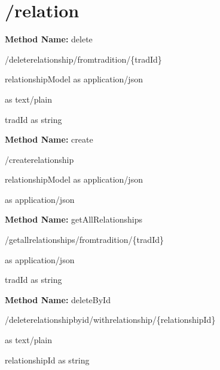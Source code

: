 \section{/relation}
\textbf{Method Name: }delete
\begin{post}
/deleterelationship/fromtradition/\{tradId\}
\end{post}
\begin{request}
relationshipModel as application/json
\end{request}
\begin{response}
 as text/plain
\end{response}
\begin{parameter}
tradId as string
\end{parameter}
\textbf{Method Name: }create
\begin{post}
/createrelationship
\end{post}
\begin{request}
relationshipModel as application/json
\end{request}
\begin{response}
 as application/json
\end{response}
\textbf{Method Name: }getAllRelationships
\begin{get}
/getallrelationships/fromtradition/\{tradId\}
\end{get}
\begin{response}
 as application/json
\end{response}
\begin{parameter}
tradId as string
\end{parameter}
\textbf{Method Name: }deleteById
\begin{delete}
/deleterelationshipbyid/withrelationship/\{relationshipId\}
\end{delete}
\begin{response}
 as text/plain
\end{response}
\begin{parameter}
relationshipId as string
\end{parameter}
